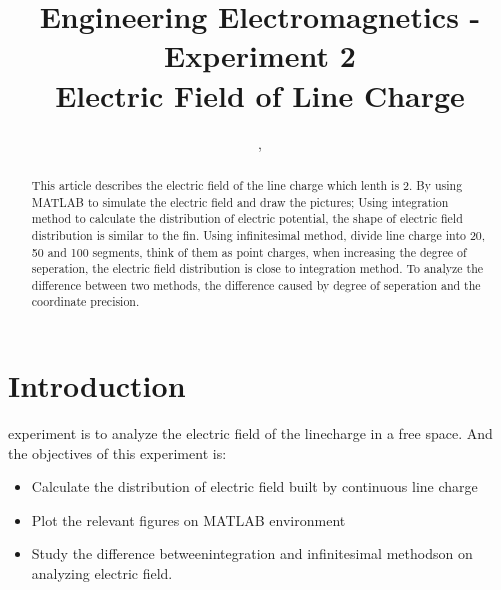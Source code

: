 \documentclass[10pt, journal, final]{IEEEtran}
\begin{document}
\title{Engineering Electromagnetics - Experiment 2\\ Electric Field of Line Charge}
\author{,
    \\
}

\maketitle

\begin{abstract}
    This article describes the electric field of the line charge which lenth is 2.
    By using MATLAB to simulate the electric field and draw the pictures;
    Using integration method to calculate the distribution of electric potential,
    the shape of electric field distribution is similar to the fin.
    Using infinitesimal method, divide line charge into 20, 50 and 100 segments,
    think of them as point charges, when increasing the degree of seperation, the
    electric field distribution is close to integration method.
    To analyze the difference between two methods, the difference caused by
    degree of seperation and the coordinate precision.
\end{abstract}

\section{
  Introduction
 }
\label{sec:Intro}

 experiment is to analyze the electric field of
the linecharge in a free space. And the objectives of this experiment is:
\begin{itemize}
    \item Calculate the distribution of electric field
          built by continuous line charge
    \item Plot the relevant figures on MATLAB environment
    \item Study the difference betweenintegration and infinitesimal methodson
          on analyzing electric field.
\end{itemize}\par
\end{document}
